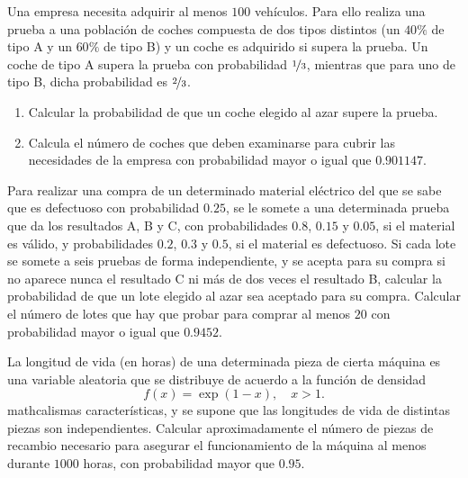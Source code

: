 \begin{ejercicio}
    Una empresa necesita adquirir al menos $100$ vehículos. Para ello realiza una prueba a una población de coches compuesta de dos tipos distintos (un $40\%$ de tipo A y un $60\%$ de tipo B) y un coche es adquirido si supera la prueba. Un coche de tipo A supera la prueba con probabilidad $\nicefrac{1}{3}$, mientras que para uno de tipo B, dicha probabilidad es $\nicefrac{2}{3}$.
    \begin{enumerate}
        \item Calcular la probabilidad de que un coche elegido al azar supere la prueba.
        \item Calcula el número de coches que deben examinarse para cubrir las necesidades de la empresa con probabilidad mayor o igual que $0.901147$.
    \end{enumerate}
\end{ejercicio}

\begin{ejercicio}
    Para realizar una compra de un determinado material eléctrico del que se sabe que es defectuoso con probabilidad $0.25$, se le somete a una determinada prueba que da los resultados A, B y C, con probabilidades $0.8$, $0.15$ y $0.05$, si el material es válido, y probabilidades $0.2$, $0.3$ y $0.5$, si el material es defectuoso. Si cada lote se somete a seis pruebas de forma independiente, y se acepta para su compra si no aparece nunca el resultado C ni más de dos veces el resultado B, calcular la probabilidad de que un lote elegido al azar sea aceptado para su compra. Calcular el número de lotes que hay que probar para comprar al menos $20$ con probabilidad mayor o igual que $0.9452$.
\end{ejercicio}

\begin{ejercicio}
    La longitud de vida (en horas) de una determinada pieza de cierta máquina es una variable aleatoria que se distribuye de acuerdo a la función de densidad
    \[
        f (x) = \exp(1 - x), \quad x > 1.
    \]mathcalismas características, y se supone que las longitudes de vida de distintas piezas son independientes. Calcular aproximadamente el número de piezas de recambio necesario para asegurar el funcionamiento de la máquina al menos durante $1000$ horas, con probabilidad mayor que $0.95$.
\end{ejercicio}